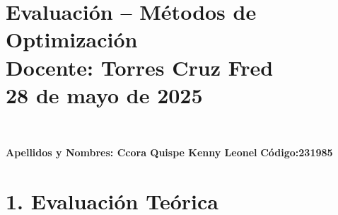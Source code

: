 \documentclass[a4paper,10pt]{article}
\begin{document}
\section*{Evaluación – Métodos de Optimización \\{Docente: Torres Cruz Fred } \\ \large 28 de mayo de 2025} \

\vspace{0.5cm}
\textbf{Apellidos y Nombres:  Ccora Quispe Kenny Leonel }  \hfill \textbf{Código:231985} 

\vspace{0.5cm}
\section*{1. Evaluación Teórica}
\end{document}
